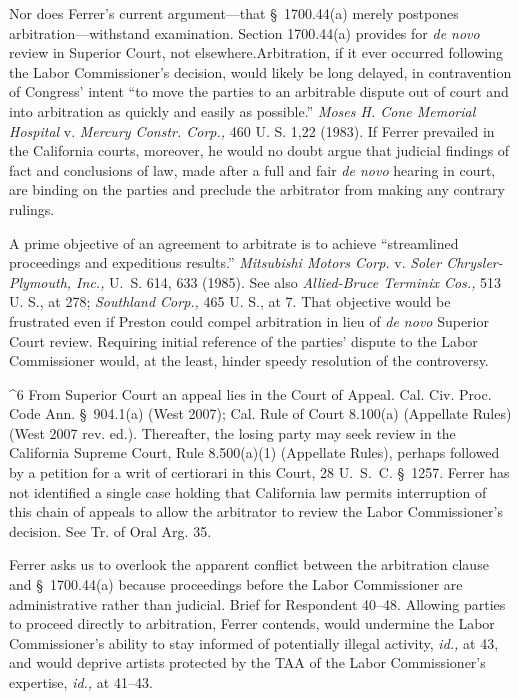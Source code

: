   Nor does Ferrer's current argument---that \S~1700.44(a) merely
postpones arbitration---withstand examination. Section 1700.44(a)
provides for \emph{de novo} review in Superior Court, not elsewhere.\footnotemark[6]
Arbitration, if it ever occurred following the Labor Commissioner's
decision, would likely be long delayed, in contravention of Congress'
intent ``to move the parties to an arbitrable dispute out of court
and into arbitration as quickly and easily as possible.'' \emph{Moses
H. Cone Memorial Hospital} v. \emph{Mercury Constr. Corp.,} 460 U. S.
1,22 (1983). If Ferrer prevailed in the California courts, moreover,
he would no doubt argue that judicial findings of fact and conclusions
of law, made after a full and fair \emph{de novo} hearing in court, are
binding on the parties and preclude the arbitrator from making any
contrary rulings.

  A prime objective of an agreement to arbitrate is to achieve
``streamlined proceedings and expeditious results.'' \emph{Mitsubishi
Motors Corp.} v. \emph{Soler Chrysler-Plymouth, Inc.,}  U.~S.
614, 633 (1985). See also \emph{Allied-Bruce Terminix Cos.,} 513 U. S.,
at 278; \emph{Southland Corp.,} 465 U. S., at 7. That objective would
be frustrated even if Preston could compel arbitration in lieu of
\emph{de novo} Superior Court review. Requiring initial reference of the
parties' dispute to the Labor Commissioner would, at the least, hinder
speedy resolution of the controversy.

^6 From Superior Court an appeal lies in the Court of Appeal. Cal.
Civ. Proc. Code Ann. \S~904.1(a) (West 2007); Cal. Rule of Court
8.100(a) (Appellate Rules) (West 2007 rev. ed.). Thereafter, the
losing party may seek review in the California Supreme Court, Rule
8.500(a)(1) (Appellate Rules), perhaps followed by a petition for a
writ of certiorari in this Court, 28 U.~S.~C. \S~1257. Ferrer
has not identified a single case holding that California law permits
interruption of this chain of appeals to allow the arbitrator to review
the Labor Commissioner's decision. See Tr. of Oral Arg. 35.

  Ferrer asks us to overlook the apparent conflict between the
arbitration clause and \S~1700.44(a) because proceedings before the
Labor Commissioner are administrative rather than judicial. Brief
for Respondent 40--48. Allowing parties to proceed directly to
arbitration, Ferrer contends, would undermine the Labor Commissioner's
ability to stay informed of potentially illegal activity, \emph{id.,}
at 43, and would deprive artists protected by the TAA of the Labor
Commissioner's expertise, \emph{id.,} at 41--43.

